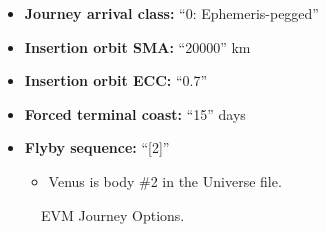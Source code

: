 \documentclass[11pt]{article}
\begin{document}
\begin{itemize}
	\item \textbf{Journey arrival class:} ``0: Ephemeris-pegged''
	\item \textbf{Insertion orbit SMA:} ``20000'' km
	\item \textbf{Insertion orbit ECC:} ``0.7''
	\item \textbf{Forced terminal coast:} ``15'' days
	\item \textbf{Flyby sequence:} ``[2]''
	\begin{itemize}
		\item Venus is body \#2 in the Universe file.
	\end{itemize}
\end{itemize}

\begin{figure}[H]
	\centering
	\caption{\label{fig:journey_options}EVM Journey Options.}
\end{figure}
\end{document}
